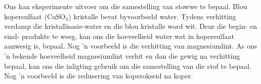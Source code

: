 Ons kan eksperimente uitvoer om die samestelling van stowwe te bepaal. Blou kopersulfaat ($\text{CuSO}_{4}$) kristalle bevat byvoorbeeld water. Tydens verhitting verdamp die kristallisasie-water en die blou kristalle word wit. Deur die begin- en eind- produkte te weeg, kan ons die hoeveelheid water wat in kopersulfaat aanwesig is, bepaal. Nog 'n voorbeeld is die verhitting van magnesiumlint. As ons 'n bekende hoeveelheid magnesiumlint verhit en dan die gewig na verhitting bepaal, kan ons die inligting gebruik om die samestelling van die stof te bepaal. Nog 'n voorbeeld is die redusering van koperokseid na koper.

    \noindent

